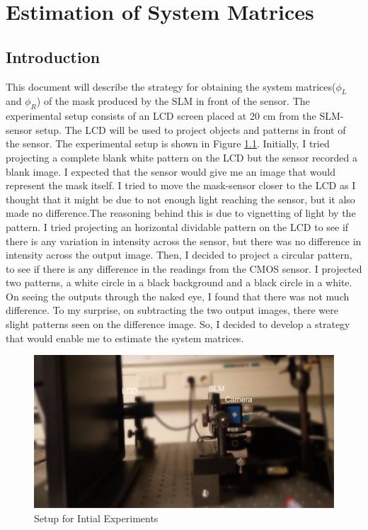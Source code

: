\chapter{Estimation of System Matrices}

\section{Introduction}
This document will describe the strategy for obtaining the system matrices(${\phi}_L$ and ${\phi}_R$) of the mask produced by the SLM in front of the sensor. The experimental setup consists of an LCD screen placed at 20 cm from the SLM-sensor setup. The LCD will be used to project objects and patterns in front of the sensor. The experimental setup is shown in Figure \ref{fig:experiment_lcd}.
Initially, I tried projecting a complete blank white pattern on the LCD but the sensor recorded a blank image. I expected that the sensor would give me an image that would represent the mask itself. I tried to move the mask-sensor closer to the LCD as I thought that it might be due to not enough light reaching the sensor, but it also made no difference.The reasoning behind this is due to vignetting of light by the pattern. I tried projecting an horizontal dividable pattern on the LCD to see if there is any variation in intensity across the sensor, but there was no difference in intensity across the output image. Then, I decided to project a circular pattern, to see if there is any difference in the readings from the CMOS sensor. I projected two patterns, a white circle in a black background and a black circle in a white. On seeing the outputs through the naked eye, I found that there was not much difference. To my surprise, on subtracting the two output images, there were slight patterns seen on the difference image. So, I decided to develop a strategy that would enable me to estimate the system matrices.

\begin{figure}[h]
\centering
\includegraphics[width = 0.75\linewidth]{pics/experiment_lcd}
\caption{Setup for Intial Experiments}
\label{fig:experiment_lcd}
\end{figure}

